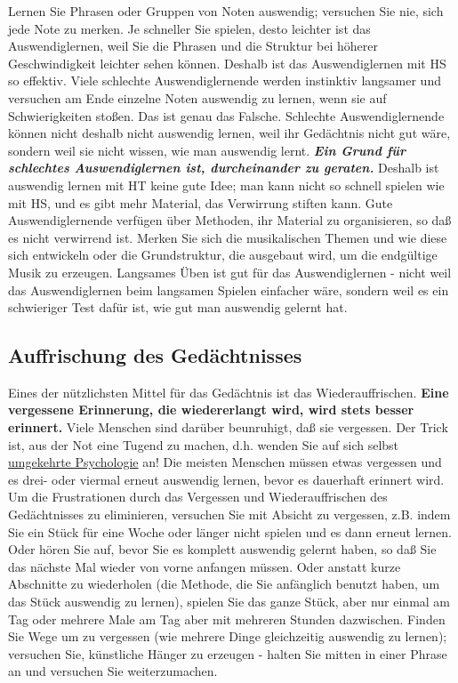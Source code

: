 Lernen Sie Phrasen oder Gruppen von Noten auswendig; versuchen Sie nie, sich jede Note zu merken.
Je schneller Sie spielen, desto leichter ist das Auswendiglernen, weil Sie die Phrasen und die Struktur bei höherer Geschwindigkeit leichter sehen können.
Deshalb ist das Auswendiglernen mit HS so effektiv.
Viele schlechte Auswendiglernende werden instinktiv langsamer und versuchen am Ende einzelne Noten auswendig zu lernen, wenn sie auf Schwierigkeiten stoßen.
Das ist genau das Falsche.
Schlechte Auswendiglernende können nicht deshalb nicht auswendig lernen, weil ihr Gedächtnis nicht gut wäre, sondern weil sie nicht wissen, wie man auswendig lernt.
\textbf{\textit{Ein Grund für schlechtes Auswendiglernen ist, durcheinander zu geraten.}}
Deshalb ist auswendig lernen mit HT keine gute Idee; man kann nicht so schnell spielen wie mit HS, und es gibt mehr Material, das Verwirrung stiften kann.
Gute Auswendiglernende verfügen über Methoden, ihr Material zu organisieren, so daß es nicht verwirrend ist.
Merken Sie sich die musikalischen Themen und wie diese sich entwickeln oder die Grundstruktur, die ausgebaut wird, um die endgültige Musik zu erzeugen.
Langsames Üben ist gut für das Auswendiglernen - nicht weil das Auswendiglernen beim langsamen Spielen einfacher wäre, sondern weil es ein schwieriger Test dafür ist, wie gut man auswendig gelernt hat.


\subsection{Auffrischung des Gedächtnisses}\hypertarget{c1iii6f}{}

Eines der nützlichsten Mittel für das Gedächtnis ist das Wiederauffrischen.
\textbf{Eine vergessene Erinnerung, die wiedererlangt wird, wird stets besser erinnert.}
Viele Menschen sind darüber beunruhigt, daß sie vergessen.
Der Trick ist, aus der Not eine Tugend zu machen, d.h. wenden Sie auf sich selbst \hyperlink{reversepsychology}{umgekehrte Psychologie} an!
Die meisten Menschen müssen etwas vergessen und es drei- oder viermal erneut auswendig lernen, bevor es dauerhaft erinnert wird.
Um die Frustrationen durch das Vergessen und Wiederauffrischen des Gedächtnisses zu eliminieren, versuchen Sie mit Absicht zu vergessen, z.B. indem Sie ein Stück für eine Woche oder länger nicht spielen und es dann erneut lernen.
Oder hören Sie auf, bevor Sie es komplett auswendig gelernt haben, so daß Sie das nächste Mal wieder von vorne anfangen müssen.
Oder anstatt kurze Abschnitte zu wiederholen (die Methode, die Sie anfänglich benutzt haben, um das Stück auswendig zu lernen), spielen Sie das ganze Stück, aber nur einmal am Tag oder mehrere Male am Tag aber mit mehreren Stunden dazwischen.
Finden Sie Wege um zu vergessen (wie mehrere Dinge gleichzeitig auswendig zu lernen); versuchen Sie, künstliche Hänger zu erzeugen - halten Sie mitten in einer Phrase an und versuchen Sie weiterzumachen.

